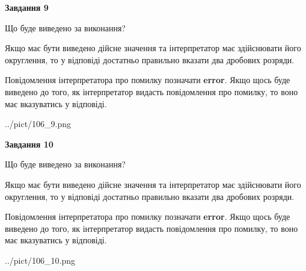 \documentclass[12pt, ukrainian]{article}
\begin{document}
{\begin {Large}
{\begin {center}\textbf{Завдання 9}\end {center}}\par
Що буде виведено за виконання? \par

Якщо має бути виведено дійсне значення та інтерпретатор має здійснювати його округлення, 
то у відповіді достатньо правильно вказати два дробових розряди.

Повідомлення інтерпретатора про помилку позначати \textbf{error}.
Якщо щось буде виведено до того, як інтерпретатор видасть повідомлення про помилку, 
то воно має вказуватись у відповіді. \par

\begin{center}
	{../pict/106_9.png}
\end{center}
\newpage

{\begin {center}\textbf{Завдання 10}\end {center}}\par
Що буде виведено за виконання? \par

Якщо має бути виведено дійсне значення та інтерпретатор має здійснювати його округлення, 
то у відповіді достатньо правильно вказати два дробових розряди.

Повідомлення інтерпретатора про помилку позначати \textbf{error}.
Якщо щось буде виведено до того, як інтерпретатор видасть повідомлення про помилку, 
то воно має вказуватись у відповіді. \par

\begin{center}
	{../pict/106_10.png}
\end{center}
\newpage

\end {Large}}
\end{document}
